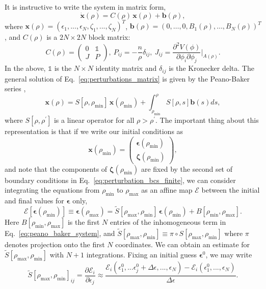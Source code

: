 \documentclass[final,3p,11pt,pdflatex]{elsarticle}
\renewcommand{\refeq}[1]{Eq.~\ref{#1}}
\newcommand{\rhomin}{\ensuremath{\rho_{\text{min}}}}
\newcommand{\rhomax}{\ensuremath{\rho_{\text{max}}}}
\begin{document}
It is instructive to write the system in matrix form,
%
\begin{equation}
\label{eq:perturbations_matrix}
\dot{\bm{x}}(\rho) = C(\rho) \, \bm{x}(\rho)
+ \bm{b}(\rho),
\end{equation}
%
where $\bm{x}(\rho) = (\epsilon_1,...,\epsilon_N,\zeta_1,...,\zeta_N)^T$,
$\bm{b}(\rho) = (0,\ldots,0,B_1(\rho),\ldots,B_N(\rho))^T$, and
$C(\rho)$ is a $2N\times 2N$ block matrix:
%
\begin{equation}
C(\rho) = \begin{pmatrix}
0 & \mathds{1} \\
J & P
\end{pmatrix},\ P_{ij} = -\frac{n}{\rho} \delta_{ij},\ J_{ij} =
\frac{\partial^2 V(\phi)}{\partial \phi_i \partial \phi_j}\Big|_{A(\rho)}.
\end{equation}
In the above, $\mathds{1}$ is the $N\times N$ identity matrix and $\delta_{ij}$
is the Kronecker delta.  The general solution of \refeq{eq:perturbations_matrix}
is given by the Peano-Baker series \cite{BaakePeanoBakerseries2011},
%
\begin{equation}
\label{eq:peano_baker_system}
\bm{x}(\rho) = S[\rho,\rhomin]\,\bm{x}(\rhomin)
+ \int_{\rhomin}^{\rho}S[\rho,s]\bm{b}(s) ds,
\end{equation}
%
where $S[\rho, \rho^{\prime}]$ is a linear operator for all
$\rho > \rho^{\prime}$.  The important thing about this
representation is that if we write our initial conditions as
%
\begin{equation}
\bm{x}(\rhomin) = \begin{pmatrix}
\bm{\epsilon}(\rhomin) \\
\bm{\zeta}(\rhomin)
\end{pmatrix},
\end{equation}
%
and note that the components of $\bm{\zeta}(\rhomin)$ are fixed by the
second set of boundary conditions in \refeq{eq:perturbation_bcs_finite}, we can
consider integrating the equations from $\rhomin$ to $\rhomax$ as an affine map
$\mathcal{E}$ between the initial and final values for $\bm{\epsilon}$
only,
%
\begin{equation}
  \mathcal{E}\left[\bm{\epsilon}(\rhomin)\right] \equiv \bm{\epsilon}(\rhomax)
  = \tilde{S}[\rhomax,\rhomin]\,\bm{\epsilon}(\rhomin) + B[\rhomin, \rhomax].
\end{equation}
%
Here $B[\rhomin,\rhomax]$ is the first $N$ entries of the inhomogeneous term in
\refeq{eq:peano_baker_system}, and $\tilde{S}[\rhomax,\rhomin] \equiv \pi \circ
S[\rhomax,\rhomin]$ where $\pi$ denotes projection onto the first $N$
coordinates.  We can obtain an estimate for $\tilde{S}[\rhomax,\rhomin]$ with
$N + 1$ integrations.  Fixing an initial guess $\bm{\epsilon}^0$, we may
write
%
\begin{equation}
  \tilde{S}[\rhomax,\rhomin]_{ij} =
  \frac{\partial \mathcal{E}_i}{\partial \epsilon_j}
  \approx \frac{\mathcal{E}_i(\epsilon^0_1,...\epsilon^0_j
    + \Delta \epsilon,...,\epsilon_N)
    - \mathcal{E}_i(\epsilon^0_1,...,\epsilon_N)}{\Delta \epsilon}.
\end{equation}
\end{document}
